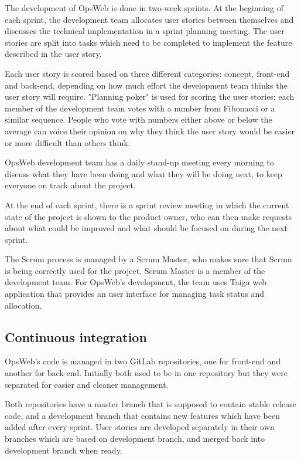 The development of OpsWeb is done in two-week sprints. At the beginning of each sprint, the development team allocates user stories between themselves and discusses the technical implementation in a sprint planning meeting. The user stories are split into tasks which need to be completed to implement the feature described in the user story. 

Each user story is scored based on three different categories: concept, front-end and back-end, depending on how much effort the development team thinks the user story will require. "Planning poker" is used for scoring the user stories; each member of the development team votes with a number from Fibonacci or a similar sequence. People who vote with numbers either above or below the average can voice their opinion on why they think the user story would be easier or more difficult than others think. \cite{grenning2002planning}

OpsWeb development team has a daily stand-up meeting every morning to discuss what they have been doing and what they will be doing next, to keep everyone on track about the project.

At the end of each sprint, there is a sprint review meeting in which the current state of the project is shown to the product owner, who can then make requests about what could be improved and what should be focused on during the next sprint.

The Scrum process is managed by a Scrum Master, who makes sure that Scrum is being correctly used for the project. Scrum Master is a member of the development team. \cite{beck2001manifesto, scrum} For OpsWeb's development, the team uses Taiga web application that provides an user interface for managing task status and allocation.  \cite{taiga}

\subsection{Continuous integration}
OpsWeb's code is managed in two GitLab repositories, one for front-end and another for back-end. Initially both used to be in one repository but they were separated for easier and cleaner management.

Both repositories have a master branch that is supposed to contain stable release code, and a development branch that contains new features which have been added after every sprint. User stories are developed separately in their own branches which are based on development branch, and merged back into development branch when ready.

